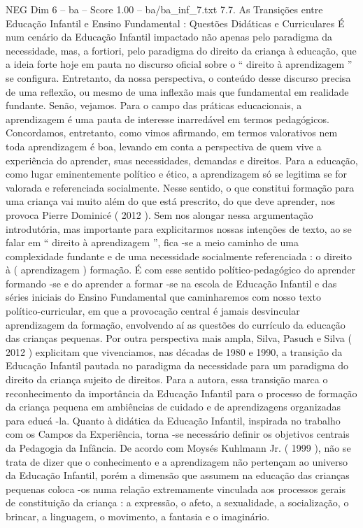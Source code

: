 \begin{textsample}{NEG Dim 6 – ba – Score 1.00 – ba/ba\_inf\_7.txt}  \label{ex:f6_neg_215}
7.7.
As Transições entre Educação Infantil e Ensino Fundamental : Questões Didáticas e Curriculares É num cenário da Educação Infantil impactado não apenas pelo paradigma da necessidade, mas, a fortiori, pelo paradigma do direito da criança à educação, que a ideia forte hoje em pauta no discurso oficial sobre o “ direito à aprendizagem ” se configura.
Entretanto, da nossa perspectiva, o conteúdo desse discurso precisa de uma reflexão, ou mesmo de uma inflexão mais que fundamental em realidade fundante.
Senão, vejamos.
Para o campo das práticas educacionais, a aprendizagem é uma pauta de interesse inarredável em termos pedagógicos.
Concordamos, entretanto, como vimos afirmando, em termos valorativos nem toda aprendizagem é boa, levando em conta a perspectiva de quem vive a experiência do aprender, suas necessidades, demandas e direitos.
Para a educação, como lugar eminentemente político e ético, a aprendizagem só se legitima se for valorada e referenciada socialmente.
Nesse sentido, o que constitui formação para uma criança vai muito além do que está prescrito, do que deve aprender, nos provoca Pierre Dominicé ( 2012 ).
Sem nos alongar nessa argumentação introdutória, mas importante para explicitarmos nossas intenções de texto, ao se falar em “ direito à aprendizagem ”, fica -se a meio caminho de uma complexidade fundante e de uma necessidade socialmente referenciada : o direito à ( aprendizagem ) formação.
É com esse sentido político-pedagógico do aprender formando -se e do aprender a formar -se na escola de Educação Infantil e das séries iniciais do Ensino Fundamental que caminharemos com nosso texto político-curricular, em que a provocação central é jamais desvincular aprendizagem da formação, envolvendo aí as questões do currículo da educação das crianças pequenas.
Por outra perspectiva mais ampla, Silva, Pasuch e Silva ( 2012 ) explicitam que vivenciamos, nas décadas de 1980 e 1990, a transição da Educação Infantil pautada no paradigma da necessidade para um paradigma do direito da criança sujeito de direitos.
Para a autora, essa transição marca o reconhecimento da importância da Educação Infantil para o processo de formação da criança pequena em ambiências de cuidado e de aprendizagens organizadas para educá -la.
Quanto à didática da Educação Infantil, inspirada no trabalho com os Campos da Experiência, torna -se necessário definir os objetivos centrais da Pedagogia da Infância.
De acordo com Moysés Kuhlmann Jr. ( 1999 ), não se trata de dizer que o conhecimento e a aprendizagem não pertençam ao universo da Educação Infantil, porém a dimensão que assumem na educação das crianças pequenas coloca -os numa relação extremamente vinculada aos processos gerais de constituição da criança : a expressão, o afeto, a sexualidade, a socialização, o brincar, a linguagem, o movimento, a fantasia e o imaginário.

\end{textsample}

